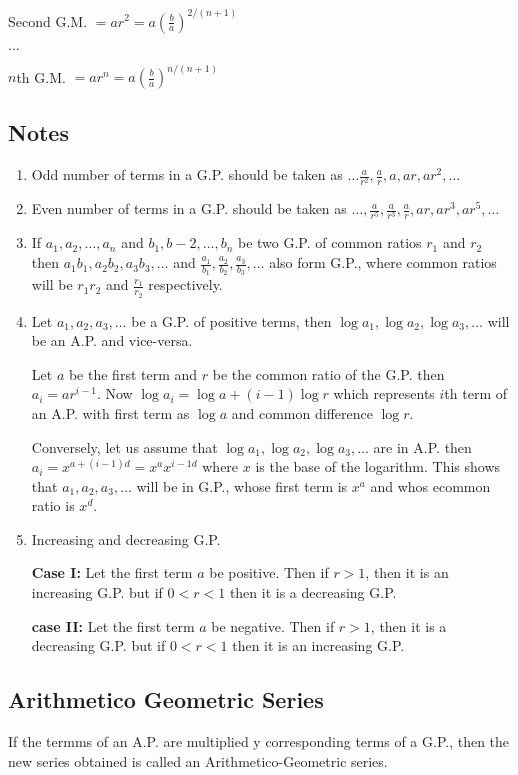 Second G.M. $= ar^2 = a\left(\frac{b}{a}\right)^{2/(n + 1)}$

$\ldots$

$n$th G.M. $= ar^{n} = a\left(\frac{b}{a}\right)^{n/(n + 1)}$
\subsection{Notes}
\begin{enumerate}
\item Odd number of terms in a G.P. should be taken as $\ldots\frac{a}{r^2}, \frac{a}{r}, a, ar, ar^2, \ldots$
\item Even number of terms in a G.P. should be taken as $\ldots, \frac{a}{r^5}, \frac{a}{r^3}, \frac{a}{r}, ar, ar^3, ar^5, \ldots$
\item If $a_1, a_2, \ldots, a_n$ and $b_1, b-2, \ldots, b_n$ be two G.P. of common ratios $r_1$ and $r_2$ then $a_1b_1, a_2b_2,
  a_3b_3, \ldots$ and $\frac{a_1}{b_1}, \frac{a_2}{b_2}, \frac{a_3}{b_3}, \ldots$ also form G.P., where common ratios will be
  $r_1r_2$ and $\frac{r_1}{r_2}$ respectively.
\item Let $a_1, a_2, a_3, \ldots$ be a G.P. of positive terms, then $\log a_1, \log a_2, \log a_3, \ldots$ will be an A.P. and
  vice-versa.

  Let $a$ be the first term and $r$ be the common ratio of the G.P. then $a_i = ar^{i - 1}$. Now $\log a_i = \log a + (i - 1)\log
  r$ which represents $i$th term of an A.P. with first term as $\log a$ and common difference $\log r$.

  Conversely, let us assume that $\log a_1, \log a_2, \log a_3, \ldots$ are in A.P. then $a_i = x^{a + (i - 1)d} = x^ax^{{i - 1}d}$
  where $x$ is the base of the logarithm. This shows that $a_1, a_2, a_3,\ldots$ will be in G.P., whose first term is $x^a$ and
  whos ecommon ratio is $x^d$.
\item Increasing and decreasing G.P.

  \textbf{Case I:} Let the first term $a$ be positive. Then if $r > 1$, then it is an increasing G.P. but if $0< r< 1$ then it is a
  decreasing G.P.

  \textbf{case II:} Let the first term $a$ be negative. Then if $r > 1$, then it is a decreasing G.P. but if $0 < r < 1$ then it is
  an increasing G.P.
\end{enumerate}

\subsection{Arithmetico Geometric Series}
If the termms of an A.P. are multiplied y corresponding terms of a G.P., then the new series obtained is called an
Arithmetico-Geometric series.

